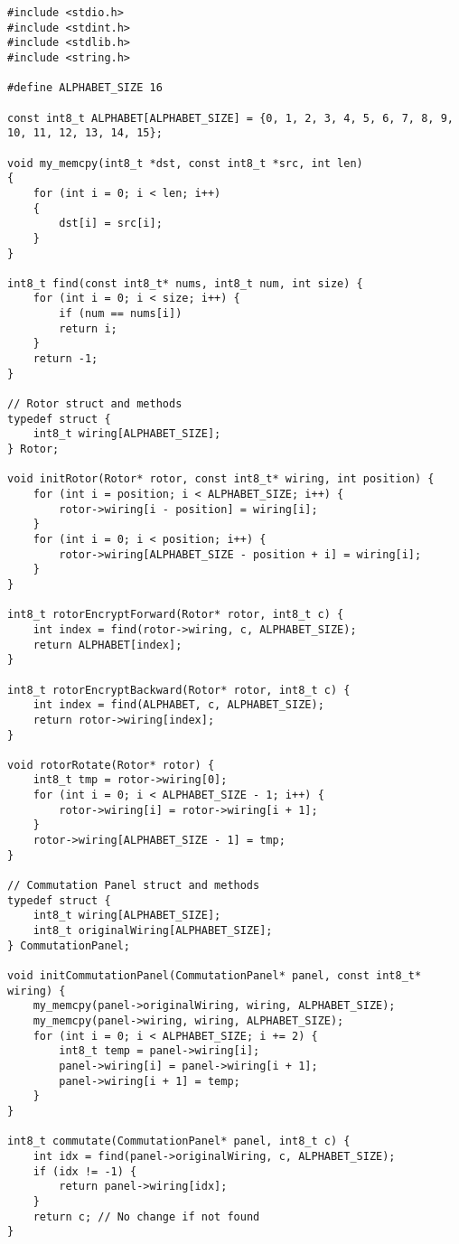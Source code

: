 \begin{center}
    \captionsetup{justification=raggedright,singlelinecheck=off}
    \begin{lstlisting}[label=lst:enigma1,caption=Реализация алгоритма шифрования машины <<Энигма>>]
#include <stdio.h>
#include <stdint.h>
#include <stdlib.h>
#include <string.h>

#define ALPHABET_SIZE 16

const int8_t ALPHABET[ALPHABET_SIZE] = {0, 1, 2, 3, 4, 5, 6, 7, 8, 9, 10, 11, 12, 13, 14, 15};

void my_memcpy(int8_t *dst, const int8_t *src, int len)
{
	for (int i = 0; i < len; i++)
	{
		dst[i] = src[i];
	}
}

int8_t find(const int8_t* nums, int8_t num, int size) {
	for (int i = 0; i < size; i++) {
		if (num == nums[i])
		return i;
	}
	return -1; 
}

// Rotor struct and methods
typedef struct {
	int8_t wiring[ALPHABET_SIZE];
} Rotor;

void initRotor(Rotor* rotor, const int8_t* wiring, int position) {
	for (int i = position; i < ALPHABET_SIZE; i++) {
		rotor->wiring[i - position] = wiring[i];
	}
	for (int i = 0; i < position; i++) {
		rotor->wiring[ALPHABET_SIZE - position + i] = wiring[i];
	}
}

int8_t rotorEncryptForward(Rotor* rotor, int8_t c) {
	int index = find(rotor->wiring, c, ALPHABET_SIZE);
	return ALPHABET[index];
}

int8_t rotorEncryptBackward(Rotor* rotor, int8_t c) {
	int index = find(ALPHABET, c, ALPHABET_SIZE);
	return rotor->wiring[index];
}

void rotorRotate(Rotor* rotor) {
	int8_t tmp = rotor->wiring[0];
	for (int i = 0; i < ALPHABET_SIZE - 1; i++) {
		rotor->wiring[i] = rotor->wiring[i + 1];
	}
	rotor->wiring[ALPHABET_SIZE - 1] = tmp;
}

// Commutation Panel struct and methods
typedef struct {
	int8_t wiring[ALPHABET_SIZE];
	int8_t originalWiring[ALPHABET_SIZE];
} CommutationPanel;

void initCommutationPanel(CommutationPanel* panel, const int8_t* wiring) {
	my_memcpy(panel->originalWiring, wiring, ALPHABET_SIZE);
	my_memcpy(panel->wiring, wiring, ALPHABET_SIZE);
	for (int i = 0; i < ALPHABET_SIZE; i += 2) {
		int8_t temp = panel->wiring[i];
		panel->wiring[i] = panel->wiring[i + 1];
		panel->wiring[i + 1] = temp;
	}
}

int8_t commutate(CommutationPanel* panel, int8_t c) {
	int idx = find(panel->originalWiring, c, ALPHABET_SIZE);
	if (idx != -1) {
		return panel->wiring[idx];
	}
	return c; // No change if not found
}


\end{lstlisting}
\end{center}

